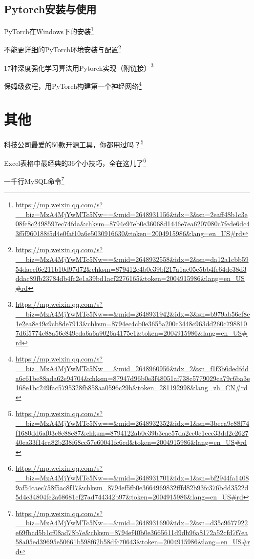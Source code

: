 \documentclass[]{ctexbook}
\renewcommand{\href}[2]{#2\footnote{\url{#1}}}
\begin{document}
\hypertarget{pytorchux5b89ux88c5ux4e0eux4f7fux7528}{%
\subsection{Pytorch安装与使用}\label{pytorchux5b89ux88c5ux4e0eux4f7fux7528}}

\href{https://mp.weixin.qq.com/s?__biz=MzA4MjYwMTc5Nw==\&mid=2648931156\&idx=3\&sn=2eaff48b1c3e08fc8c2498597ec74fda\&chksm=8794e97eb0e36068d1446e7ea6207080c7fede6dc43f5f960188f5d4e0faf10a6e5030916630\&token=2004915986\&lang=en_US\#rd}{PyTorch在Windows下的安装}

\href{https://mp.weixin.qq.com/s?__biz=MzA4MjYwMTc5Nw==\&mid=2648932558\&idx=2\&sn=da12a1cbb5954dacef6c211b10d97d72\&chksm=879412e4b0e39bf217a1ae05c5bb4fe64de38d3ddac89fb23784db4fc2e1a39bd1acf2276165\&token=2004915986\&lang=en_US\#rd}{不能更详细的PyTorch环境安装与配置}

\href{https://mp.weixin.qq.com/s?__biz=MzA4MjYwMTc5Nw==\&mid=2648931942\&idx=3\&sn=b979ab56ef8e1e2ea8e49c9cb8de7913\&chksm=8794ec4cb0e3655a200c3448c963dd260c7988107d6f5774c88a56c849cda6a6a9026a4175e1\&token=2004915986\&lang=en_US\#rd}{17种深度强化学习算法用Pytorch实现（附链接）}

\href{https://mp.weixin.qq.com/s?__biz=MzA4MjYwMTc5Nw==\&mid=2648960956\&idx=2\&sn=f1f3b6dedfdda6c61be88ada62e94704\&chksm=87947d96b0e3f48051af738c5779029ca79c6ba3e168e1bc249fac5795328fb858aa0596c29b\&token=281192998\&lang=zh_CN\#rd}{保姆级教程，用PyTorch构建第一个神经网络}

\hypertarget{ux5176ux4ed6-4}{%
\section{其他}\label{ux5176ux4ed6-4}}

\href{https://mp.weixin.qq.com/s?__biz=MzA4MjYwMTc5Nw==\&mid=2648932352\&idx=1\&sn=3beca9c88f74f1680dd6af03c8e88e87\&chksm=8794122ab0e39b3cae57da2ce0c1ece33dd2c262740ea33f14ca82b238f68cc57e60041fc6cd\&token=2004915986\&lang=en_US\#rd}{科技公司最爱的50款开源工具，你都用过吗？}

\href{https://mp.weixin.qq.com/s?__biz=MzA4MjYwMTc5Nw==\&mid=2648931701\&idx=1\&sn=bf2944fa14089af54caec758f5ac8f17\&chksm=8794ef5fb0e3664969832fffd82b93fc376bdd3522d5d4e34804fc2a68681cf27ad744342b97\&token=2004915986\&lang=en_US\#rd}{Excel表格中最经典的36个小技巧，全在这儿了}

\href{https://mp.weixin.qq.com/s?__biz=MzA4MjYwMTc5Nw==\&mid=2648931690\&idx=2\&sn=d35c9677922e69fbcd5b1cf08ad78b7e\&chksm=8794ef40b0e3665611d9db96a8172a52cfd7f7ea58a05ed39695e50661b598f62b58dfc70643\&token=2004915986\&lang=en_US\#rd}{一千行MySQL命令}
\end{document}
